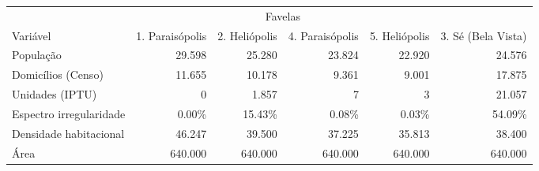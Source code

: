 \begingroup
\fontsize{6.8pt}{8.1pt}\selectfont
\begin{longtable}{lrrrrr}
\toprule
 & \multicolumn{4}{c}{Favelas} &  \\ 
\cmidrule(lr){2-5}
Variável & 1. Paraisópolis & 2. Heliópolis  & 4. Paraisópolis & 5. Heliópolis & 3. Sé (Bela Vista) \\ 
\midrule\addlinespace[2.5pt]
População & 29.598 & 25.280 & 23.824 & 22.920 & 24.576 \\ 
Domicílios (Censo) & 11.655 & 10.178 & 9.361 & 9.001 & 17.875 \\ 
Unidades (IPTU) & 0 & 1.857 & 7 & 3 & 21.057 \\ 
Espectro irregularidade & 0.00\% & 15.43\% & 0.08\% & 0.03\% & 54.09\% \\ 
Densidade habitacional & 46.247 & 39.500 & 37.225 & 35.813 & 38.400 \\ 
Área & 640.000 & 640.000 & 640.000 & 640.000 & 640.000 \\ 
\bottomrule
\end{longtable}
\endgroup

